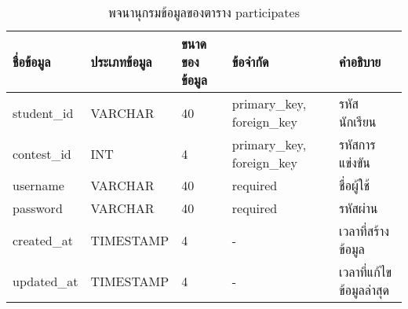 \begin{table}[H]
    \caption{พจนานุกรมข้อมูลของตาราง participates}
    \label{tab:database-participates}
    \begin{tabularx}{\textwidth}{ | p{2.25cm} | p{2.20cm} | p{2.45cm} | p{2.15cm} | X | }
    \hline
    \textbf{ชื่อข้อมูล} & \textbf{ประเภทข้อมูล} & \textbf{ขนาดของข้อมูล} & \textbf{ข้อจำกัด} & \textbf{คำอธิบาย} \\
    \hline
    student\_id & VARCHAR & 40 & primary\_key, foreign\_key & รหัสนักเรียน \\
    \hline
    contest\_id & INT & 4 & primary\_key, foreign\_key & รหัสการแข่งขัน \\
    \hline
    username & VARCHAR & 40 & required & ชื่อผู้ใช้ \\
    \hline
    password & VARCHAR & 40 & required & รหัสผ่าน \\
    \hline
    created\_at & TIMESTAMP & 4 & - & เวลาที่สร้างข้อมูล \\
    \hline
    updated\_at & TIMESTAMP & 4 & - & เวลาที่แก้ไขข้อมูลล่าสุด \\
    \hline
    \end{tabularx}
\end{table}